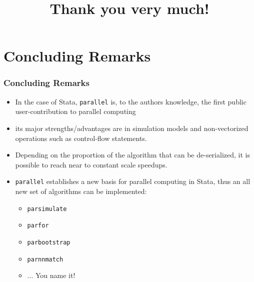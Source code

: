 \documentclass[9pt]{beamer}
\begin{document}
\section{Concluding Remarks}

\begin{frame}
\frametitle{Concluding Remarks}

\begin{itemize}
\item In the case of Stata, {\tt parallel} is, to the authors knowledge, the first public user-contribution to parallel computing\pause
\item its major strengths/advantages are in simulation models and non-vectorized operations such as control-flow statements.\pause
\item Depending on the proportion of the algorithm that can be de-serialized, it is possible to reach near to constant scale speedups.\pause
\item {\tt parallel} establishes a new basis for parallel computing in Stata,\pause{}
thus an all new set of algorithms can be implemented:\pause
\begin{itemize}
\item {\tt parsimulate}\pause
\item {\tt parfor}\pause
\item {\tt parbootstrap}\pause
\item {\tt parnnmatch}\pause
\item ... {\large You name it!}
\end{itemize}
\end{itemize}

\end{frame}

\title{Thank you very much!}

\frame{\maketitle
}
\end{document}
